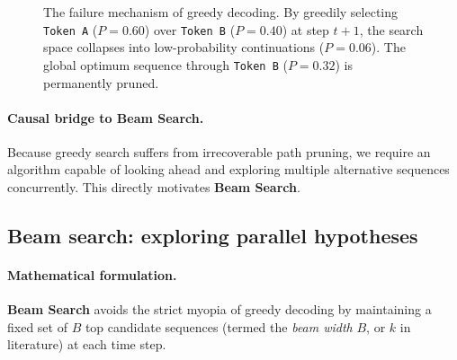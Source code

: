 \documentclass[../../main.tex]{subfiles}
\begin{document}
\begin{figure}[htbp]
\caption{The failure mechanism of greedy decoding. By greedily selecting \texttt{Token A} ($P=0.60$) over \texttt{Token B} ($P=0.40$) at step $t+1$, the search space collapses into low-probability continuations ($P=0.06$). The global optimum sequence through \texttt{Token B} ($P=0.32$) is permanently pruned.}
\label{fig:greedy_search_failure}
\end{figure}

\paragraph{Causal bridge to Beam Search.}
Because greedy search suffers from irrecoverable path pruning, we require an algorithm capable of looking ahead and exploring multiple alternative sequences concurrently. This directly motivates \textbf{Beam Search}.

\subsection{Beam search: exploring parallel hypotheses}
\label{subsec:beam_search}

\paragraph{Mathematical formulation.}
\textbf{Beam Search} avoids the strict myopia of greedy decoding by maintaining a fixed set of $B$ top candidate sequences (termed the \emph{beam width} $B$, or $k$ in literature) at each time step.
\end{document}
